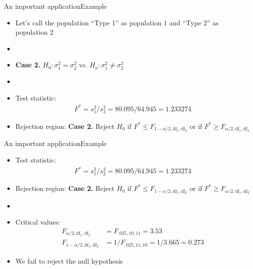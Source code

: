 \documentclass[xcolor=dvipsnames]{beamer}
\begin{document}
\begin{frame}{An important application}{Example}
	\begin{itemize}
		\item Let's call the population ``Type 1'' as population 1 and ``Type 2'' as population 2
		\item[]
		\item \textbf{Case 2.} $H_0: \sigma_1^2 = \sigma_2^2$ vs. $H_a: \sigma_1^2 \neq \sigma_2^2$
		\item[]
		\item Test statistic:
		\begin{gather*}
		F^* = s_1^2 /s_2^2 =  80.095 / 64.945 = 1.233274
		\end{gather*}
		\item Rejection region: \textbf{Case 2.} Reject $H_0$ if $F^* \leq F_{1-\alpha / 2, \text{df}_1,\text{df}_2}$ or if $F^* \geq F_{\alpha / 2, \text{df}_1,\text{df}_2} $
	\end{itemize}
\end{frame}

\begin{frame}{An important application}{Example}
	\begin{itemize}
		\item Test statistic:
		\begin{gather*}
		F^* = s_1^2 /s_2^2 =  80.095 / 64.945 = 1.233274
		\end{gather*}
		\item Rejection region: \textbf{Case 2.} Reject $H_0$ if $F^* \leq F_{1-\alpha / 2, \text{df}_1,\text{df}_2}$ or if $F^* \geq F_{\alpha / 2, \text{df}_1,\text{df}_2} $
		\item[]
		\item Critical values:
		\begin{align*}
			F_{\alpha/2, \text{df}_1,\text{df}_2} &= F_{.025, 10, 11} = 3.53 \\
			F_{1-\alpha/2, \text{df}_1,\text{df}_2} &= 1 / F_{.025, 11, 10} = 1/3.665 = 0.273
		\end{align*}
		\item We fail to reject the null hypothesis
	\end{itemize}
\end{frame}
\end{document}
